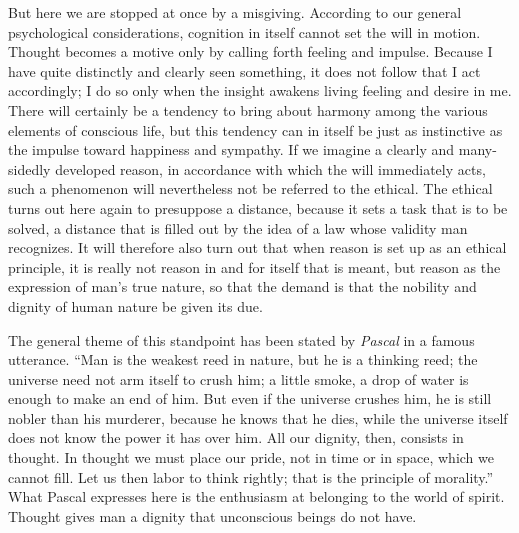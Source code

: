 \documentclass[12pt,a4paper,openany]{book}
\newcommand{\opage}[1]{\marginnote{\footnotesize\textit{[#1]}}}
\begin{document}
But here we are stopped at once by a misgiving. According to our general
psychological considerations, cognition in itself cannot set the will in
motion. Thought becomes a motive only by calling forth feeling and impulse.
Because I have quite distinctly and clearly seen something, it does not follow
that I act accordingly; I do so only when the insight awakens living feeling
and desire in me. There will certainly be a tendency to bring about harmony
among the various elements of conscious life, but this tendency can in itself
be just as instinctive as the impulse toward happiness and sympathy. %
If we imagine a clearly and many-sidedly developed reason, in accordance with
which the will immediately \opage{45}acts, such a phenomenon will nevertheless
not be referred to the ethical. The ethical turns out here again to presuppose
a distance, because it sets a task that is to be solved, a distance that is
filled out by the idea of a law whose validity man recognizes. It will
therefore also turn out that when reason is set up as an ethical principle, it
is really not reason in and for itself that is meant, but reason as the
expression of man's true nature, so that the demand is that the nobility and
dignity of human nature be given its due.

The general theme of this standpoint has been stated by \emph{Pascal} in a
famous utterance. ``Man is the weakest reed in nature, but he is a thinking
reed; the universe need not arm itself to crush him; a little smoke, a drop of
water is enough to make an end of him. But even if the universe crushes him,
he is still nobler than his murderer, because he knows that he dies, while the
universe itself does not know the power it has over him. All our dignity,
then, consists in thought. In thought we must place our pride, not in time or
in space, which we cannot fill. Let us then labor to think rightly; that is
the principle of morality.'' What Pascal expresses here is the enthusiasm at
belonging to the world of spirit. Thought gives man a dignity that unconscious
beings do not have.
\end{document}
